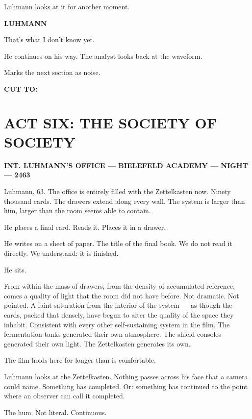 \documentclass[12pt]{article}
\newcommand{\sceneheading}[1]{%
  \vspace{10pt}%
  \noindent\textbf{#1}%
  \vspace{6pt}%
}
\newcommand{\trans}[1]{%
  \vspace{8pt}%
  \begin{flushright}\textbf{#1}\end{flushright}%
  \vspace{4pt}%
}
\newcommand{\character}[1]{%
  \vspace{8pt}%
  \begin{center}\textbf{#1}\end{center}%
  \vspace{-4pt}%
}
\newenvironment{dialogue}{%
  \begin{center}%
  \begin{minipage}{0.62\textwidth}%
}{%
  \end{minipage}%
  \end{center}%
  \vspace{4pt}%
}
\newenvironment{action}{%
  \vspace{4pt}%
  \noindent\ignorespaces%
}{%
  \vspace{6pt}%
}
\begin{document}
\begin{action}
Luhmann looks at it for another moment.
\end{action}

\character{LUHMANN}
\begin{dialogue}
That's what I don't know yet.
\end{dialogue}

\begin{action}
He continues on his way. The analyst looks back at the waveform.

Marks the next section as noise.
\end{action}

\trans{CUT TO:}


\section*{ACT SIX: THE SOCIETY OF SOCIETY}

\sceneheading{INT. LUHMANN'S OFFICE — BIELEFELD ACADEMY — NIGHT — 2463}

\begin{action}
Luhmann, 63. The office is entirely filled with the Zettelkasten now. Ninety thousand cards. The drawers extend along every wall. The system is larger than him, larger than the room seems able to contain.

\medskip

He places a final card. Reads it. Places it in a drawer.

\medskip

He writes on a sheet of paper. The title of the final book. We do not read it directly. We understand: it is finished.

\medskip

He sits.

\medskip

From within the mass of drawers, from the density of accumulated reference, comes a quality of light that the room did not have before. Not dramatic. Not pointed. A faint saturation from the interior of the system — as though the cards, packed that densely, have begun to alter the quality of the space they inhabit. Consistent with every other self-sustaining system in the film. The fermentation tanks generated their own atmosphere. The shield consoles generated their own light. The Zettelkasten generates its own.

\medskip

The film holds here for longer than is comfortable.

\medskip

Luhmann looks at the Zettelkasten. Nothing passes across his face that a camera could name. Something has completed. Or: something has continued to the point where an observer can call it completed.

\medskip

The hum. Not literal. Continuous.
\end{action}
\end{document}
